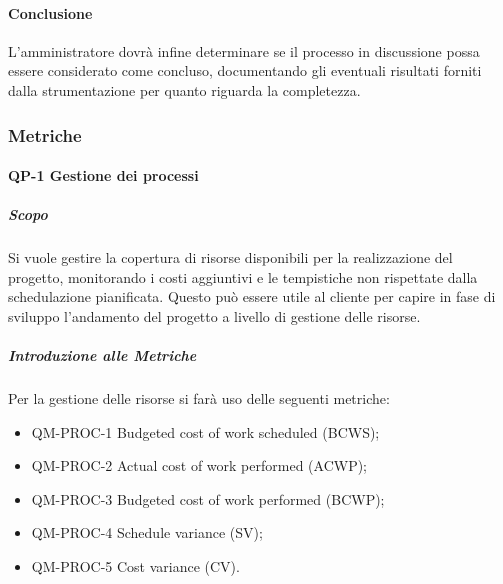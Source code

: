 		\paragraph{Conclusione}
			L'amministratore dovrà infine determinare se il processo in discussione possa essere considerato come concluso, documentando gli eventuali risultati forniti dalla strumentazione per quanto riguarda la completezza.	 		

	\subsubsection{Metriche}
		\paragraph{QP-1 Gestione dei processi}

			\subparagraph{Scopo}
				Si vuole gestire la copertura di risorse disponibili per la realizzazione del progetto, monitorando i costi aggiuntivi e le tempistiche non rispettate dalla schedulazione pianificata. Questo può essere utile al cliente per capire in fase di sviluppo l'andamento del progetto a livello di gestione delle risorse.

			\subparagraph{Introduzione alle Metriche}

				Per la gestione delle risorse si farà uso delle seguenti metriche:

			\begin{itemize}
				\item QM-PROC-1 Budgeted cost of work scheduled (BCWS);
				\item QM-PROC-2 Actual cost of work performed (ACWP);
				\item QM-PROC-3 Budgeted cost of work performed (BCWP);
				\item QM-PROC-4 Schedule variance (SV);
				\item QM-PROC-5 Cost variance (CV).
			\end{itemize}

